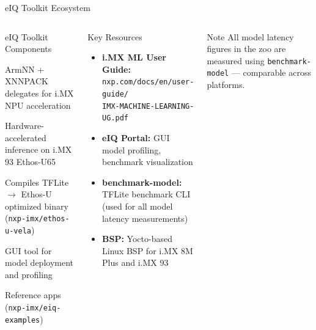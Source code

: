 \documentclass[aspectratio=169]{beamer}
\begin{document}
\begin{frame}{eIQ Toolkit Ecosystem}
  \begin{columns}[T]
      \begin{block}{eIQ Toolkit Components}
        \begin{description}\small
          \item[\textbf{TFLite Runtime}] ArmNN + XNNPACK delegates for i.MX NPU acceleration
          \item[\textbf{Ethos-U Delegate}] Hardware-accelerated inference on i.MX 93 Ethos-U65
          \item[\textbf{Vela Compiler}] Compiles TFLite $\to$ Ethos-U optimized binary (\texttt{nxp-imx/ethos-u-vela})
          \item[\textbf{eIQ Portal}] GUI tool for model deployment and profiling
          \item[\textbf{eIQ Examples}] Reference apps (\texttt{nxp-imx/eiq-examples})
        \end{description}
      \end{block}
      \begin{block}{Key Resources}
        \begin{itemize}\scriptsize
          \item \textbf{i.MX ML User Guide:}\\
            \texttt{nxp.com/docs/en/user-guide/}\\
            \texttt{IMX-MACHINE-LEARNING-UG.pdf}
          \item \textbf{eIQ Portal:} GUI model profiling, benchmark visualization
          \item \textbf{benchmark-model:} TFLite benchmark CLI (used for all model latency measurements)
          \item \textbf{BSP:} Yocto-based Linux BSP for i.MX 8M Plus and i.MX 93
        \end{itemize}
      \end{block}
      \vspace{4pt}
      \begin{alertblock}{Note}
        \scriptsize All model latency figures in the zoo are measured using \texttt{benchmark-model} — comparable across platforms.
      \end{alertblock}
  \end{columns}
\end{frame}
\end{document}
